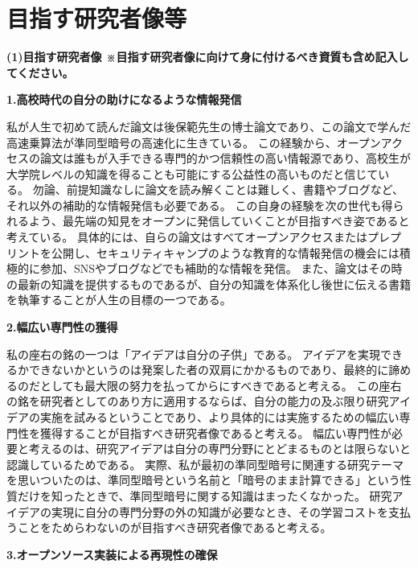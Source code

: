 
\section{目指す研究者像等}

\noindent
\textbf{(1)目指す研究者像 {\footnotesize ※目指す研究者像に向けて身に付けるべき資質も含め記入してください。}}

\noindent\textbf{1.高校時代の自分の助けになるような情報発信}

私が人生で初めて読んだ論文は後保範先生の博士論文であり、この論文で学んだ高速乗算法が準同型暗号の高速化に生きている。
この経験から、オープンアクセスの論文は誰もが入手できる専門的かつ信頼性の高い情報源であり、高校生が大学院レベルの知識を得ることも可能にする公益性の高いものだと信じている。
勿論、前提知識なしに論文を読み解くことは難しく、書籍やブログなど、それ以外の補助的な情報発信も必要である。
この自身の経験を次の世代も得られるよう、最先端の知見をオープンに発信していくことが目指すべき姿であると考えている。
具体的には、自らの論文はすべてオープンアクセスまたはプレプリントを公開し、セキュリティキャンプのような教育的な情報発信の機会には積極的に参加、SNSやブログなどでも補助的な情報を発信。
また、論文はその時の最新の知識を提供するものであるが、自分の知識を体系化し後世に伝える書籍を執筆することが人生の目標の一つである。

\noindent\textbf{2.幅広い専門性の獲得}

私の座右の銘の一つは「アイデアは自分の子供」である。
アイデアを実現できるかできないかというのは発案した者の双肩にかかるものであり、最終的に諦めるのだとしても最大限の努力を払ってからにすべきであると考える。
この座右の銘を研究者としてのあり方に適用するならば、自分の能力の及ぶ限り研究アイデアの実施を試みるということであり、より具体的には実施するための幅広い専門性を獲得することが目指すべき研究者像であると考える。
幅広い専門性が必要と考えるのは、研究アイデアは自分の専門分野にとどまるものとは限らないと認識しているためである。
実際、私が最初の準同型暗号に関連する研究テーマを思いついたのは、準同型暗号という名前と「暗号のまま計算できる」という性質だけを知ったときで、準同型暗号に関する知識はまったくなかった。
研究アイデアの実現に自分の専門分野の外の知識が必要なとき、その学習コストを支払うことをためらわないのが目指すべき研究者像であると考える。

\noindent\textbf{3.オープンソース実装による再現性の確保}

